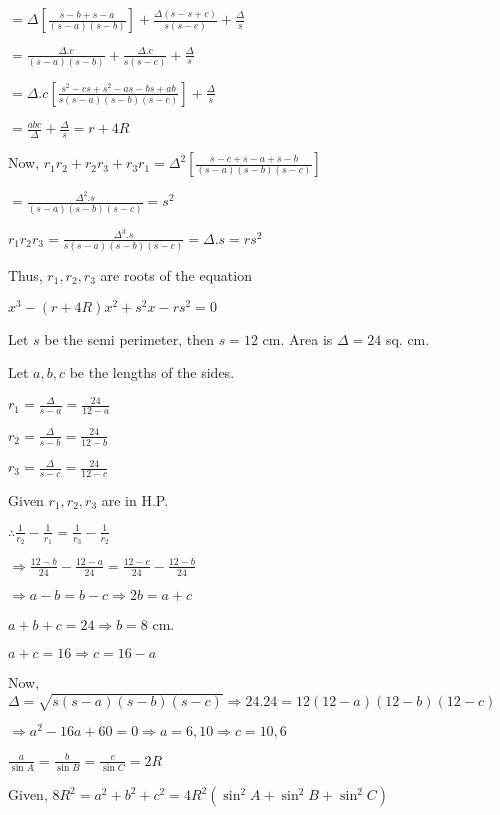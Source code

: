   $= \Delta\left[\frac{s - b + s - a}{(s - a)(s - b)}\right] + \frac{\Delta(s - s + c)}{s(s - c)} + \frac{\Delta}{s}$

  $= \frac{\Delta.c}{(s - a)(s - b)} + \frac{\Delta.c}{s(s - c)} + \frac{\Delta}{s}$

  $= \Delta.c\left[\frac{s^2 - cs + s^2 - as - bs + ab}{s(s - a)(s - b)(s - c)}\right] + \frac{\Delta}{s}$

  $= \frac{abc}{\Delta} + \frac{\Delta}{s} = r + 4R$

  Now, $r_1r_2 + r_2r_3 + r_3r_1 = \Delta^2\left[\frac{s - c + s - a + s - b}{(s - a)(s - b)(s - c)}\right]$

  $= \frac{\Delta^2.s}{(s - a)(s - b)(s - c)} = s^2$

  $r_1r_2r_3 = \frac{\Delta^3.s}{s(s - a)(s - b)(s - c)} = \Delta.s = rs^2$

  Thus, $r_1, r_2, r_3$ are roots of the equation

  $x^3 - (r + 4R)x^2 + s^2x - rs^2 = 0$

\item Let $s$ be the semi perimeter, then $s = 12$ cm. Area is $\Delta = 24$ sq. cm.

  Let $a,b,c$ be the lengths of the sides.

  $r_1 = \frac{\Delta}{s - a} = \frac{24}{12 - a}$

  $r_2 = \frac{\Delta}{s - b} = \frac{24}{12 - b}$

  $r_3 = \frac{\Delta}{s - c} = \frac{24}{12 - c}$

  Given $r_1, r_2, r_3$ are in H.P.

  $\therefore \frac{1}{r_2} - \frac{1}{r_1} = \frac{1}{r_3} - \frac{1}{r_2}$

  $\Rightarrow \frac{12 - b}{24} - \frac{12 - a}{24} = \frac{12 - c}{24} - \frac{12 - b}{24}$

  $\Rightarrow a - b = b - c \Rightarrow 2b = a + c$

  $a + b + c = 24 \Rightarrow b = 8$ cm.

  $a + c = 16 \Rightarrow c = 16 - a$

  Now, $\Delta = \sqrt{s(s - a)(s - b)(s - c)} \Rightarrow 24.24 = 12(12 - a)(12 - b)(12 - c)$

  $\Rightarrow a^2 - 16 a + 60 = 0 \Rightarrow a = 6, 10 \Rightarrow c = 10, 6$

\item $\frac{a}{\sin A} = \frac{b}{\sin B} = \frac{c}{\sin C} = 2R$

  Given, $8R^2 = a^2 + b^2 + c^2 = 4R^2(\sin^2A + \sin^2B + \sin^2C)$

